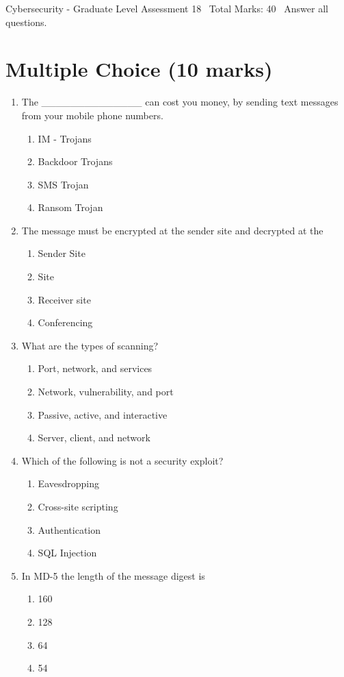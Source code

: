 \documentclass[12pt]{article}
\begin{document}
\begin{center}
Cybersecurity - Graduate Level Assessment 18 \
Total Marks: 40 \
Answer all questions.
\end{center}

\section*{Multiple Choice (10 marks)}
\begin{enumerate}[label=\arabic*.]
\item The \_\_\_\_\_\_\_\_\_\_\_\_\_\_ can cost you money, by sending text messages from your mobile phone numbers.
\begin{enumerate}[label=(\alph*)]
    \item IM - Trojans
    \item Backdoor Trojans
    \item SMS Trojan
    \item Ransom Trojan
\end{enumerate}
\item The message must be encrypted at the sender site and decrypted at the
\begin{enumerate}[label=(\alph*)]
    \item Sender Site
    \item Site
    \item Receiver site
    \item Conferencing
\end{enumerate}
\item What are the types of scanning?
\begin{enumerate}[label=(\alph*)]
    \item Port, network, and services
    \item Network, vulnerability, and port
    \item Passive, active, and interactive
    \item Server, client, and network
\end{enumerate}
\item Which of the following is not a security exploit?
\begin{enumerate}[label=(\alph*)]
    \item Eavesdropping
    \item Cross-site scripting
    \item Authentication
    \item SQL Injection
\end{enumerate}
\item In MD-5 the length of the message digest is
\begin{enumerate}[label=(\alph*)]
    \item 160
    \item 128
    \item 64
    \item 54
\end{enumerate}
\end{enumerate}
\end{document}
